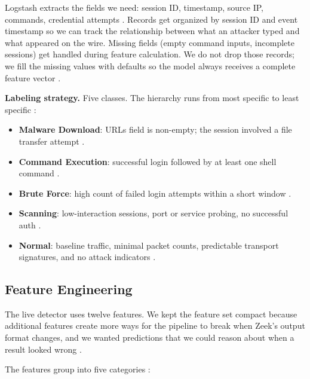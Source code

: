 Logstash extracts the fields we need: session ID, timestamp, source IP, commands, credential attempts \cite{9001068,log2evt2025}. Records get organized by session ID and event timestamp so we can track the relationship between what an attacker typed and what appeared on the wire. Missing fields (empty command inputs, incomplete sessions) get handled during feature calculation. We do not drop those records; we fill the missing values with defaults so the model always receives a complete feature vector \cite{ahsan2024effects,mary2024network}.

\textbf{Labeling strategy.} Five classes. The hierarchy runs from most specific to least specific \cite{lee2021classification,karim2024efficient}:

\begin{itemize}
\item \textbf{Malware Download}: URLs field is non-empty; the session involved a file transfer attempt \cite{9071014}.
\item \textbf{Command Execution}: successful login followed by at least one shell command \cite{9071014,9558948}.
\item \textbf{Brute Force}: high count of failed login attempts within a short window \cite{203628,famera2025mirai}.
\item \textbf{Scanning}: low-interaction sessions, port or service probing, no successful auth \cite{zhang2023identification,suareztangil2023stories}.
\item \textbf{Normal}: baseline traffic, minimal packet counts, predictable transport signatures, and no attack indicators \cite{lee2021classification}.
\end{itemize}

\subsection{Feature Engineering}
\label{subsec:feature_engineering}

The live detector uses twelve features. We kept the feature set compact because additional features create more ways for the pipeline to break when Zeek's output format changes, and we wanted predictions that we could reason about when a result looked wrong \cite{dimauro2021supervised,christy2024iot}.

The features group into five categories \cite{christy2024iot,karim2024efficient}:

